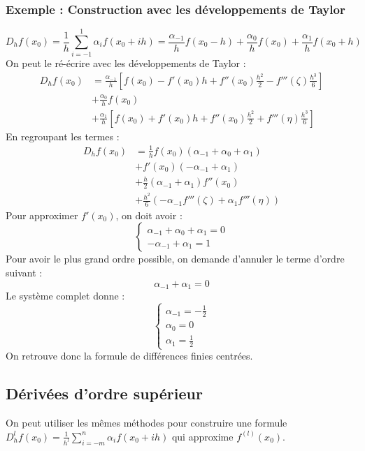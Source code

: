 \subsubsection*{Exemple : Construction avec les développements de Taylor}
$$D_h f(x_0) = \frac{1}{h} \sum_{i=-1}^1 \alpha_i f(x_0+ih) = \frac{\alpha_{-1}}{h}f(x_0-h) + \frac{\alpha_0}{h}f(x_0) + \frac{\alpha_1}{h}f(x_0+h)$$
On peut le ré-écrire avec les développements de Taylor :
\begin{align*}
D_h f(x_0) &= \frac{\alpha_{-1}}{h} \left[ f(x_0) - f'(x_0)h + f''(x_0)\frac{h^2}{2} - f'''(\zeta)\frac{h^3}{6} \right] \\
           &+ \frac{\alpha_0}{h} f(x_0) \\
           &+ \frac{\alpha_1}{h} \left[ f(x_0) + f'(x_0)h + f''(x_0)\frac{h^2}{2} + f'''(\eta)\frac{h^3}{6} \right]
\end{align*}
En regroupant les termes :
\begin{align*}
D_h f(x_0) &= \frac{1}{h} f(x_0)(\alpha_{-1}+\alpha_0+\alpha_1) \\
           &+ f'(x_0)(-\alpha_{-1}+\alpha_1) \\
           &+ \frac{h}{2}(\alpha_{-1}+\alpha_1)f''(x_0) \\
           &+ \frac{h^2}{6}(-\alpha_{-1}f'''(\zeta) + \alpha_1 f'''(\eta))
\end{align*}
Pour approximer $f'(x_0)$, on doit avoir :
$$\begin{cases} \alpha_{-1}+\alpha_0+\alpha_1 = 0 \\ -\alpha_{-1}+\alpha_1 = 1 \end{cases}$$
Pour avoir le plus grand ordre possible, on demande d'annuler le terme d'ordre suivant :
$$\alpha_{-1}+\alpha_1 = 0$$
Le système complet donne :
$$\begin{cases} \alpha_{-1} = -\frac{1}{2} \\ \alpha_0 = 0 \\ \alpha_1 = \frac{1}{2} \end{cases}$$
On retrouve donc la formule de différences finies centrées.

\subsection{Dérivées d'ordre supérieur}
On peut utiliser les mêmes méthodes pour construire une formule $D_h^l f(x_0) = \frac{1}{h^l} \sum_{i=-m}^n \alpha_i f(x_0+ih)$ qui approxime $f^{(l)}(x_0)$.

